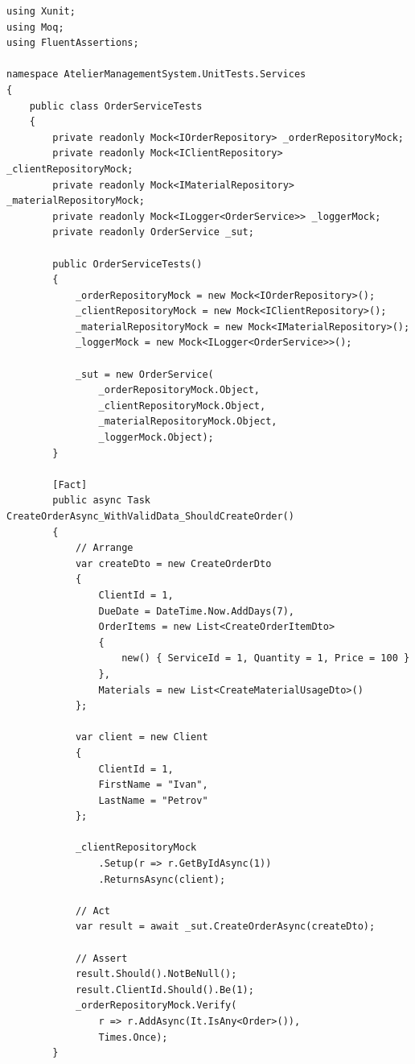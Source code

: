 \documentclass[14pt,a4paper]{extarticle}
\begin{document}
\begin{lstlisting}[language={[Sharp]C}, caption=Тести для OrderService, basicstyle=\small\ttfamily, breaklines=true, frame=single]
using Xunit;
using Moq;
using FluentAssertions;

namespace AtelierManagementSystem.UnitTests.Services
{
    public class OrderServiceTests
    {
        private readonly Mock<IOrderRepository> _orderRepositoryMock;
        private readonly Mock<IClientRepository> _clientRepositoryMock;
        private readonly Mock<IMaterialRepository> _materialRepositoryMock;
        private readonly Mock<ILogger<OrderService>> _loggerMock;
        private readonly OrderService _sut;
        
        public OrderServiceTests()
        {
            _orderRepositoryMock = new Mock<IOrderRepository>();
            _clientRepositoryMock = new Mock<IClientRepository>();
            _materialRepositoryMock = new Mock<IMaterialRepository>();
            _loggerMock = new Mock<ILogger<OrderService>>();
            
            _sut = new OrderService(
                _orderRepositoryMock.Object,
                _clientRepositoryMock.Object,
                _materialRepositoryMock.Object,
                _loggerMock.Object);
        }
        
        [Fact]
        public async Task CreateOrderAsync_WithValidData_ShouldCreateOrder()
        {
            // Arrange
            var createDto = new CreateOrderDto
            {
                ClientId = 1,
                DueDate = DateTime.Now.AddDays(7),
                OrderItems = new List<CreateOrderItemDto>
                {
                    new() { ServiceId = 1, Quantity = 1, Price = 100 }
                },
                Materials = new List<CreateMaterialUsageDto>()
            };
            
            var client = new Client 
            { 
                ClientId = 1, 
                FirstName = "Ivan", 
                LastName = "Petrov" 
            };
            
            _clientRepositoryMock
                .Setup(r => r.GetByIdAsync(1))
                .ReturnsAsync(client);
            
            // Act
            var result = await _sut.CreateOrderAsync(createDto);
            
            // Assert
            result.Should().NotBeNull();
            result.ClientId.Should().Be(1);
            _orderRepositoryMock.Verify(
                r => r.AddAsync(It.IsAny<Order>()), 
                Times.Once);
        }
        

\end{lstlisting}
\end{document}
